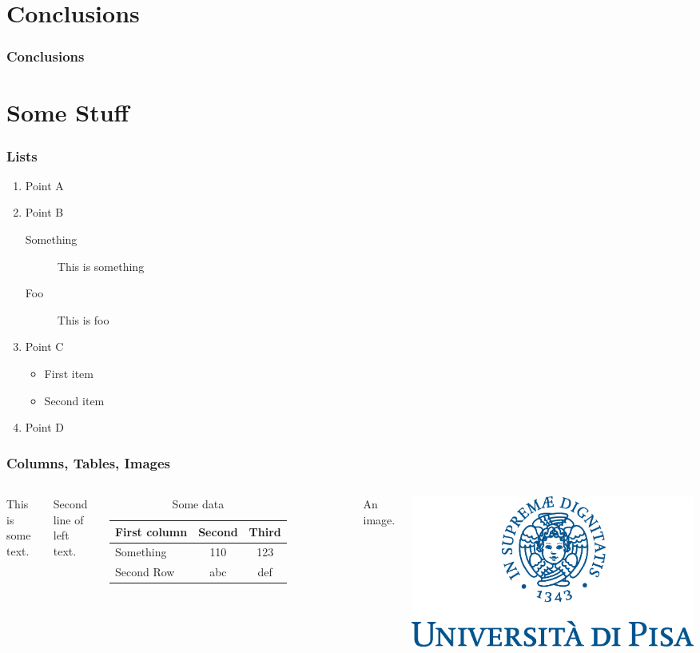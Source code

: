 \documentclass{beamer}
\begin{document}
\section{Conclusions}
\begin{frame}
	\frametitle{Conclusions}
\end{frame}

\section{Some Stuff}

\begin{frame}
	\frametitle{Lists}
	\begin{enumerate}
		\item Point A
		\item Point B
		\begin{description}
			\item[Something] This is something
			\item[Foo] This is foo
		\end{description}
		\item Point C
		\begin{itemize}
			\item First item
			\item Second item
		\end{itemize}
		\item Point D
	\end{enumerate}
\end{frame}

\begin{frame}
	\frametitle{Columns, Tables, Images}
	\begin{columns}
		This is some text.

		Second line of left text.

		\begin{table}
			\begin{tabular}{l | c | c}
				First column & Second & Third \\
				\hline \hline
				Something & 110 & 123 \\
				Second Row & abc & def
			\end{tabular}
			\caption{Some data}
		\end{table}
		An image.

		\includegraphics[scale=0.2]{img/marchio_unipi_pant541}
	\end{columns}
\end{frame}
\end{document}
